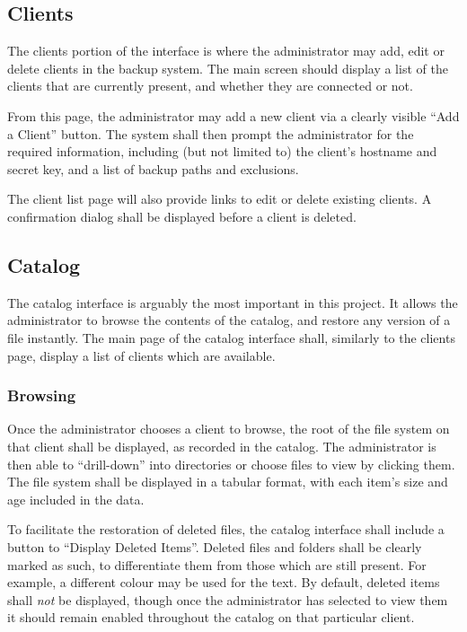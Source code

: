 \subsection{Clients}

The clients portion of the interface is where the administrator may add, edit
or delete clients in the backup system. The main screen should display a list
of the clients that are currently present, and whether they are connected or
not.

From this page, the administrator may add a new client via a clearly visible
``Add a Client'' button. The system shall then prompt the administrator for the
required information, including (but not limited to) the client's hostname and
secret key, and a list of backup paths and exclusions.

The client list page will also provide links to edit or delete existing
clients. A confirmation dialog shall be displayed before a client is deleted.

\subsection{Catalog}

The catalog interface is arguably the most important in this project. It allows
the administrator to browse the contents of the catalog, and restore any
version of a file instantly. The main page of the catalog interface shall,
similarly to the clients page, display a list of clients which are available.

\subsubsection{Browsing}

Once the administrator chooses a client to browse, the root of the file system
on that client shall be displayed, as recorded in the catalog. The
administrator is then able to ``drill-down'' into directories or choose files
to view by clicking them. The file system shall be displayed in a tabular
format, with each item's size and age included in the data.

To facilitate the restoration of deleted files, the catalog interface shall
include a button to ``Display Deleted Items''. Deleted files and folders shall
be clearly marked as such, to differentiate them from those which are still
present. For example, a different colour may be used for the text. By default,
deleted items shall \emph{not} be displayed, though once the administrator has
selected to view them it should remain enabled throughout the catalog on that
particular client.


